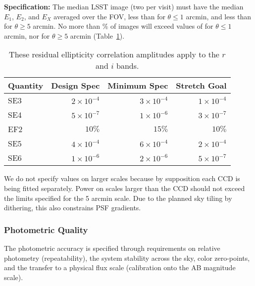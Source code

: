 {\bf Specification:} The median LSST image (two per visit) must have the median
$E_1$, $E_2$, and $E_X$ averaged over the FOV, less than
for $\theta \le 1$ arcmin, and less than
for $\theta \ge 5$ arcmin. No more than
\% of images will exceed values of
for $\theta \le 1$ arcmin, nor
for $\theta \ge 5$ arcmin (Table~\ref{Tellip2}).


\begin{table}[h]
\begin{tabular}{|l|r|r|r|}
\hline
Quantity       & Design Spec & Minimum Spec & Stretch Goal \\
\hline
SE3 & $2 \times 10^{-4}$  & $3 \times 10^{-4}$ & $1 \times 10^{-4}$ \\
SE4 & $5 \times 10^{-7}$  & $1 \times 10^{-6}$ & $3 \times 10^{-7}$ \\
EF2 & $10\%$              & $15\%$             & $10\%$             \\
SE5 & $4 \times 10^{-4}$  & $6 \times 10^{-4}$ & $2 \times 10^{-4}$ \\
SE6 & $1 \times 10^{-6}$  & $2 \times 10^{-6}$ & $5 \times 10^{-7}$ \\
\hline
\end{tabular}
\caption{These residual ellipticity correlation amplitudes apply to the $r$ and $i$ bands.}
\label{Tellip2}
\end{table}

We do not specify values on larger scales because by supposition each
CCD is being fitted separately. Power on scales larger than the CCD should
not exceed the limits specified for the 5 arcmin scale. Due to the planned sky
tiling by dithering, this also constrains PSF gradients.




\subsubsection{Photometric Quality}
\label{photoacc}
The photometric accuracy is
specified through requirements on relative photometry (repeatability), the
system stability across the sky, color zero-points, and the transfer to a
physical flux scale (\ie calibration onto the AB magnitude scale).

